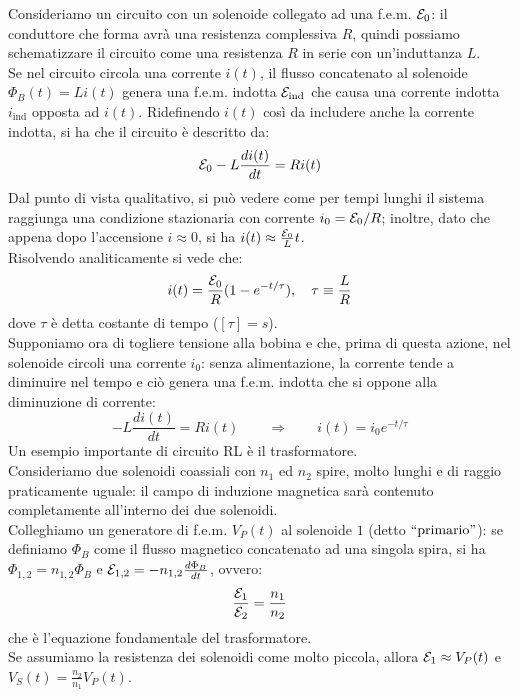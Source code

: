 Consideriamo un circuito con un solenoide collegato ad una f.e.m. $ \mathcal{E}_0 $: il conduttore che forma avrà una resistenza complessiva $ R $, quindi possiamo schematizzare il circuito come una resistenza $ R $ in serie con un'induttanza $ L $. \\ 
Se nel circuito circola una corrente $ i(t) $, il flusso concatenato al solenoide $ \Phi_B(t) = Li(t) $ genera una f.e.m. indotta $ \mathcal{E}_{\text{ind}} $ che causa una corrente indotta $ i_{\text{ind}} $ opposta ad $ i(t) $. Ridefinendo $ i(t) $ così da includere anche la corrente indotta, si ha che il circuito è descritto da:
\begin{equation}
	\mathcal{E}_0 - L \frac{di(t)}{dt} = Ri(t)
	\label{eq:29}
\end{equation}
Dal punto di vista qualitativo, si può vedere come per tempi lunghi il sistema raggiunga una condizione stazionaria con corrente $ i_0 = \mathcal{E}_0 / R $; inoltre, dato che appena dopo l'accensione $ i \approx 0 $, si ha $ i(t) \approx \frac{\mathcal{E}_0}{L} t $. \\ 
%
Risolvendo analiticamente si vede che:
\begin{equation}
	i(t) = \frac{\mathcal{E}_0}{R} (1 - e^{-t/\tau}), \quad \tau \equiv \frac{L}{R}
	\label{eq:30}
\end{equation}
dove $ \tau $ è detta costante di tempo ($ [\tau] = s $). \\ 
%
Supponiamo ora di togliere tensione alla bobina e che, prima di questa azione, nel solenoide circoli una corrente $ i_0 $: senza alimentazione, la corrente tende a diminuire nel tempo e ciò genera una f.e.m. indotta che si oppone alla diminuzione di corrente:
\begin{equation}
	-L \frac{di(t)}{dt} = Ri(t) \qquad\Longrightarrow\qquad i(t) = i_0 e^{-t/\tau}
	\label{eq:31}
\end{equation}
%
Un esempio importante di circuito RL è il trasformatore. \\ 
%
Consideriamo due solenoidi coassiali con $ n_1 $ ed $ n_2 $ spire, molto lunghi e di raggio praticamente uguale: il campo di induzione magnetica sarà contenuto completamente all'interno dei due solenoidi. \\ 
%
Colleghiamo un generatore di f.e.m. $ V_P(t) $ al solenoide $ 1 $ (detto $ ``\text{primario}" $): se definiamo $ \Phi_B $ come il flusso magnetico concatenato ad una singola spira, si ha $ \Phi_{1,2} = n_{1,2} \Phi_B $ e $ \mathcal{E}_{1,2} = - n_{1,2} \frac{d\Phi_B}{dt} $, ovvero:
\begin{equation}
	\frac{\mathcal{E}_1}{\mathcal{E}_2} = \frac{n_1}{n_2}
	\label{eq:32}
\end{equation}
che è l'equazione fondamentale del trasformatore. \\ 
%
Se assumiamo la resistenza dei solenoidi come molto piccola, allora $ \mathcal{E}_1 \approx V_P(t) $ e $ V_S(t) = \frac{n_2}{n_1}V_P(t) $.

